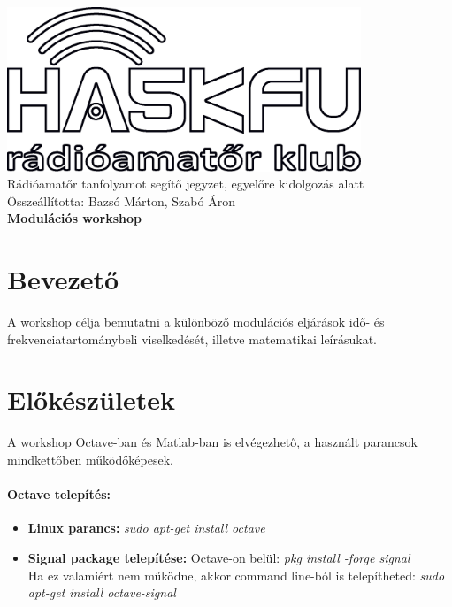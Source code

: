 \documentclass[12pt,a4paper]{article}
\begin{document}
\begin{center}
\includegraphics[width=300pt,keepaspectratio]{figures/ha5kfu.eps}
\\[0.5cm]
Rádióamatőr tanfolyamot segítő jegyzet, egyelőre kidolgozás alatt \\
Összeállította: Bazsó Márton, Szabó Áron %
\\[1cm]

{\huge \bfseries Modulációs workshop \\[2cm]}



\end{center}

\renewcommand{\contentsname}{Tartalom}\tableofcontents 
\newpage

\newpage

\section{Bevezető}
A workshop célja bemutatni a különböző modulációs eljárások idő- és frekvenciatartománybeli viselkedését, illetve matematikai leírásukat. 

\section{Előkészületek}
A workshop Octave-ban és Matlab-ban is elvégezhető, a használt parancsok mindkettőben működőképesek.

\paragraph{Octave telepítés:} 
\begin{itemize}
	\item \textbf{Linux parancs:} \textit{sudo apt-get install octave}
	\item \textbf{Signal package telepítése:} Octave-on belül: \textit{pkg install -forge signal}\\
	Ha ez valamiért nem működne, akkor command line-ból is telepítheted: \textit{sudo apt-get install octave-signal}
\end{itemize}
\end{document}
